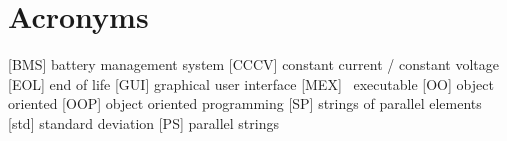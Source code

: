 \section*{Acronyms}
\thispagestyle{plain}
\begin{acronym}
	[BMS] battery management system
	[CCCV] constant current / constant voltage
	[EOL] end of life
	[GUI] graphical user interface
	[MEX] \matlab\ executable
	[OO] object oriented
	[OOP] object oriented programming
	[SP] strings of parallel elements
	[std] standard deviation
	[PS] parallel strings
\end{acronym}